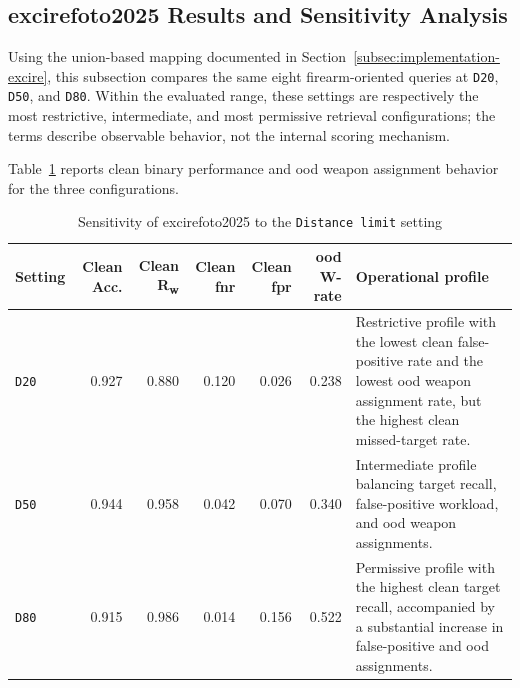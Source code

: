 \subsection{\texorpdfstring{\gls{excirefoto2025}}{Excire Foto 2025} Results and Sensitivity Analysis}
\label{subsec:results-excire}

Using the union-based mapping documented in
Section~\ref{subsec:implementation-excire}, this subsection compares the same
eight firearm-oriented queries at \texttt{D20}, \texttt{D50}, and
\texttt{D80}. Within the evaluated range, these settings are respectively the
most restrictive, intermediate, and most permissive retrieval configurations;
the terms describe observable behavior, not the internal scoring mechanism.

Table~\ref{tab:results-excire-sensitivity} reports clean binary performance and
\gls{ood} weapon assignment behavior for the three configurations.

\begin{table}[H]
\centering
\scriptsize
\renewcommand{\arraystretch}{1.15}
\setlength{\tabcolsep}{4pt}
\caption{Sensitivity of \gls{excirefoto2025} to the
\texttt{Distance limit} setting}
\label{tab:results-excire-sensitivity}
\begin{tabularx}{0.96\textwidth}{@{}l r r r r r X@{}}
\toprule
\textbf{Setting} &
\textbf{Clean Acc.} &
\textbf{Clean R\textsubscript{w}} &
\textbf{Clean \gls{fnr}} &
\textbf{Clean \gls{fpr}} &
\textbf{\acrshort{ood} W-rate} &
\textbf{Operational profile} \\
\midrule

\texttt{D20}
&
0.927
&
0.880
&
0.120
&
0.026
&
0.238
&
Restrictive profile with the lowest clean false-positive rate and the lowest
\gls{ood} weapon assignment rate, but the highest clean missed-target rate. \\

\texttt{D50}
&
0.944
&
0.958
&
0.042
&
0.070
&
0.340
&
Intermediate profile balancing target recall, false-positive workload, and
\gls{ood} weapon assignments. \\

\texttt{D80}
&
0.915
&
0.986
&
0.014
&
0.156
&
0.522
&
Permissive profile with the highest clean target recall, accompanied by a
substantial increase in false-positive and \gls{ood} assignments. \\

\bottomrule
\end{tabularx}
\end{table}

